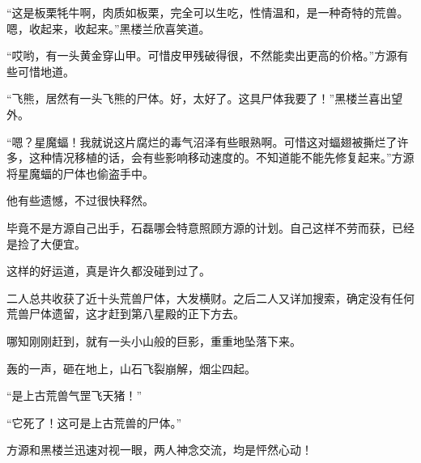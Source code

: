 \begin{this_body}
“这是板栗牦牛啊，肉质如板栗，完全可以生吃，性情温和，是一种奇特的荒兽。嗯，收起来，收起来。”黑楼兰欣喜笑道。

“哎哟，有一头黄金穿山甲。可惜皮甲残破得很，不然能卖出更高的价格。”方源有些可惜地道。

“飞熊，居然有一头飞熊的尸体。好，太好了。这具尸体我要了！”黑楼兰喜出望外。

“嗯？星魔蝠！我就说这片腐烂的毒气沼泽有些眼熟啊。可惜这对蝠翅被撕烂了许多，这种情况移植的话，会有些影响移动速度的。不知道能不能先修复起来。”方源将星魔蝠的尸体也偷盗手中。

他有些遗憾，不过很快释然。

毕竟不是方源自己出手，石磊哪会特意照顾方源的计划。自己这样不劳而获，已经是捡了大便宜。

这样的好运道，真是许久都没碰到过了。

二人总共收获了近十头荒兽尸体，大发横财。之后二人又详加搜索，确定没有任何荒兽尸体遗留，这才赶到第八星殿的正下方去。

哪知刚刚赶到，就有一头小山般的巨影，重重地坠落下来。

轰的一声，砸在地上，山石飞裂崩解，烟尘四起。

“是上古荒兽气罡飞天猪！”

“它死了！这可是上古荒兽的尸体。”

方源和黑楼兰迅速对视一眼，两人神念交流，均是怦然心动！

\end{this_body}

